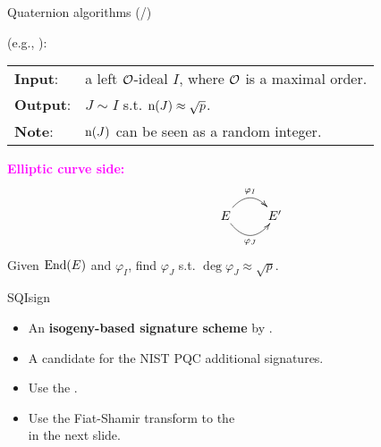 \begin{frame}{Quaternion algorithms (/\algquatotal{})}

    {\large
    }
    (e.g., \cite[Algorithm 2.7.5]{Cohen2010_ccnt}):\\[5pt]
    \begin{tabular}{l l}
        \textbf{Input}: & a left $\mathcal{O}$-ideal $I$,
                            where $\mathcal{O}$ is a maximal order.\\[3pt]
        \textbf{Output}: & $J \sim I$ s.t. $\mathrm{n}(J) \approx \sqrt{p}$.\\[3pt]
        \textbf{Note}: & 
                $\mathrm{n}(J)$ can be seen as a random integer.
    \end{tabular}

    \vspace{15pt}
    \textcolor{magenta}{\textbf{Elliptic curve side:}}
    \begin{align*}
        \xymatrix{
            & E \ar@/^15pt/[r]^{\varphi_I} \ar@/_15pt/[r]_{\varphi_J}
            & E'
        }
    \end{align*}
    Given $\mathrm{End}(E)$ and $\varphi_I$,
    find $\varphi_J$ s.t. $\deg\varphi_J \approx \sqrt{p}$.
\end{frame}

\begin{frame}{SQIsign}
    \begin{itemize}
        \setlength{\itemsep}{10pt}
        \item An \textbf{isogeny-based signature scheme} by \cite{AC:DKLPW20}.
        \item A candidate for the NIST PQC additional signatures.
        \item Use the .
        \item Use the Fiat-Shamir transform to the \\ in the next slide.
    \end{itemize}
\end{frame}

